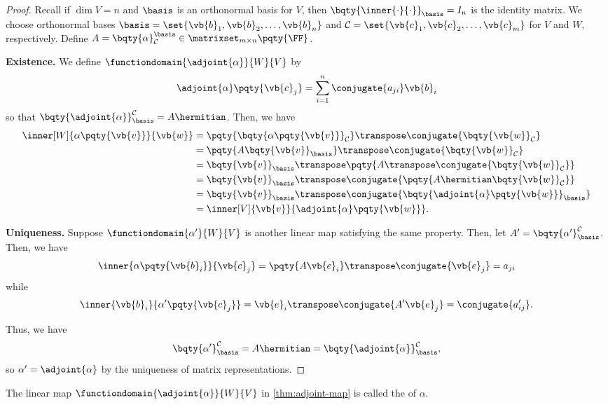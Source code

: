 \begin{proof}
    Recall if \(\dim V = n\) and \(\basis\) is an orthonormal basis for \(V\), then \(\bqty{\inner{\cdot}{\cdot}}_{\basis} = I_n\) is the identity matrix. We choose orthonormal bases \(\basis = \set{\vb{b}_1, \vb{b}_2, \ldots, \vb{b}_n}\) and \(\mathcal{C} = \set{\vb{c}_1, \vb{c}_2, \ldots, \vb{c}_m}\) for \(V\) and \(W\), respectively. Define \(A = \bqty{\alpha}_{\mathcal{C}}^{\basis} \in \matrixset_{m \times n} \pqty{\FF}\).

    \textbf{Existence.} We define \(\functiondomain{\adjoint{\alpha}}{W}{V}\) by
    \[
        \adjoint{\alpha} \pqty{\vb{c}_j} = \sum_{i = 1}^{n} \conjugate{a_{ji}} \vb{b}_i
    \]
    so that \(\bqty{\adjoint{\alpha}}_{\basis}^{\mathcal{C}} = A\hermitian\). Then, we have
    \begin{align*}
        \inner[W]{\alpha\pqty{\vb{v}}}{\vb{w}} &= \pqty{\bqty{\alpha\pqty{\vb{v}}}_{\mathcal{C}}}\transpose \conjugate{\bqty{\vb{w}}_{\mathcal{C}}} \\
        &= \pqty{A \bqty{\vb{v}}_{\basis}}\transpose \conjugate{\bqty{\vb{w}}_{\mathcal{C}}} \\
        &= \bqty{\vb{v}}_{\basis}\transpose \pqty{A\transpose \conjugate{\bqty{\vb{w}}_{\mathcal{C}}}} \\
        &= \bqty{\vb{v}}_{\basis}\transpose \conjugate{\pqty{A\hermitian \bqty{\vb{w}}_{\mathcal{C}}}} \\
        &= \bqty{\vb{v}}_{\basis}\transpose \conjugate{\bqty{\adjoint{\alpha}\pqty{\vb{w}}}_{\basis}} \\
        &= \inner[V]{\vb{v}}{\adjoint{\alpha}\pqty{\vb{w}}}.
    \end{align*}

    \textbf{Uniqueness.} Suppose \(\functiondomain{\alpha'}{W}{V}\) is another linear map satisfying the same property. Then, let \(A' = \bqty{\alpha'}_{\basis}^{\mathcal{C}}\). Then, we have
    \[
        \inner{\alpha\pqty{\vb{b}_i}}{\vb{c}_j} = \pqty{A \vb{e}_i}\transpose \conjugate{\vb{e}_j} = a_{ji}
    \]
    while
    \[
        \inner{\vb{b}_i}{\alpha'\pqty{\vb{c}_j}} = \vb{e}_i\transpose \conjugate{A' \vb{e}_j} = \conjugate{a'_{ij}}.
    \]

    Thus, we have
    \[
        \bqty{\alpha'}_{\basis}^{\mathcal{C}} = A\hermitian = \bqty{\adjoint{\alpha}}_{\basis}^{\mathcal{C}},
    \]
    so \(\alpha' = \adjoint{\alpha}\) by the uniqueness of matrix representations.
\end{proof}

\begin{definition}
    The linear map \(\functiondomain{\adjoint{\alpha}}{W}{V}\) in \autoref{thm:adjoint-map} is called the  of \(\alpha\).
\end{definition}

